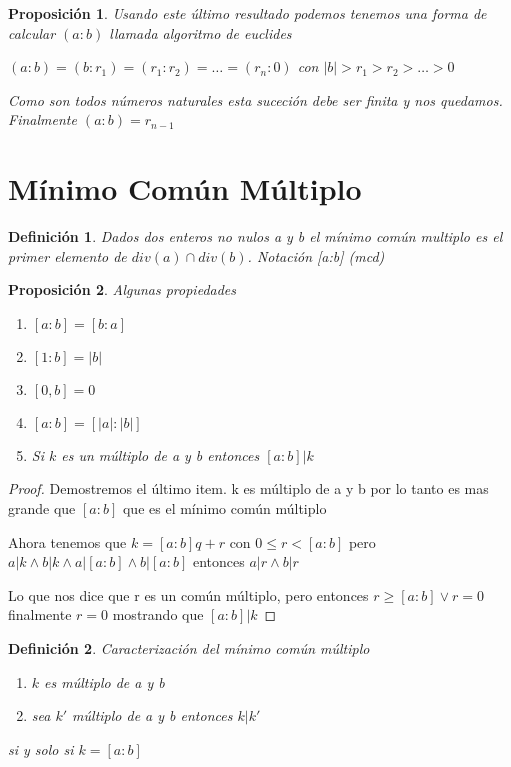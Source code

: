 \documentclass{article}
\theoremstyle{break}
\newtheorem{proposition}{Proposición}
\newtheorem{definition}{Definición}[section]
\begin{document}
    \begin{proposition}
        Usando este último resultado podemos tenemos una forma de calcular $(a:b)$ llamada algoritmo de euclides

        $(a:b) = (b:r_1) = (r_1:r_2) = \ldots = (r_n:0)$ con $|b| > r_1 > r_2 > \ldots > 0 $

        Como son todos números naturales esta suceción debe ser finita y nos quedamos. Finalmente $(a:b) = r_{n-1}$
    \end{proposition}

    \section{Mínimo Común Múltiplo}
    \begin{definition}
        Dados dos enteros no nulos a y b el mínimo común multiplo es el primer elemento de $div(a) \cap div(b)$. Notación [a:b] (mcd)
    \end{definition}

    \begin{proposition}
        Algunas propiedades
        \begin{enumerate}
            \item $[a:b] = [b:a] $
            \item $[1:b] = |b|$
            \item $[0,b]=0$
            \item $[a:b]=[|a|:|b|]$
            \item Si $k$ es un múltiplo de a y b entonces $[a:b]|k$
        \end{enumerate}
    \end{proposition}
    \begin{proof}
        Demostremos el último item. k es múltiplo de a y b por lo tanto es mas grande que $[a:b]$ que es el mínimo común múltiplo

        Ahora tenemos que $k = [a:b]q + r$ con $0\leq r < [a:b]$ pero $a|k \land b|k \land a|[a:b] \land b|[a:b]$ entonces $a|r \land b|r$

        Lo que nos dice que r es un común múltiplo, pero entonces $r\geq [a:b] \lor r=0$ finalmente $r=0$ mostrando que $[a:b]|k$ 
    \end{proof}

    \begin{definition}
        Caracterización del mínimo común múltiplo
        \begin{enumerate}
            \item $k$ es múltiplo de a y b
            \item sea $k'$ múltiplo de a y b entonces $k|k'$
        
        \end{enumerate}
        si y solo si $k=[a:b]$
    \end{definition}
\end{document}

